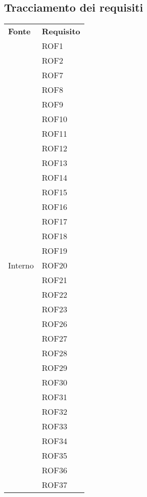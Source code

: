 \subsection{Tracciamento dei requisiti}
\begin{longtable}{| p{5cm} | p{5cm} |}
		\rowcolor{LightBlue}
		\color{white}\bfseries Fonte & \color{white}\bfseries Requisito \\[0.25cm]
\multirow[t]{61}{*}{Interno}		
				& 	ROF1 \\
				&	ROF2 \\
				&	ROF7 \\
				&	ROF8 \\
				&	ROF9 \\
				&	ROF10 \\
				&	ROF11 \\
				&	ROF12 \\
				&	ROF13 \\
				&	ROF14 \\
				&	ROF15 \\
				&	ROF16 \\
				&	ROF17 \\
				&	ROF18 \\
				&	ROF19 \\
				& 	ROF20 \\
				& 	ROF21 \\
				& 	ROF22 \\
				& 	ROF23 \\
				& 	ROF26 \\
				& 	ROF27 \\
				& 	ROF28 \\
				& 	ROF29 \\
				& 	ROF30 \\
				& 	ROF31 \\
				& 	ROF32 \\
				& 	ROF33 \\
				& 	ROF34 \\
				& 	ROF35 \\
				& 	ROF36 \\
				& 	ROF37 \\
				

\end{longtable}
